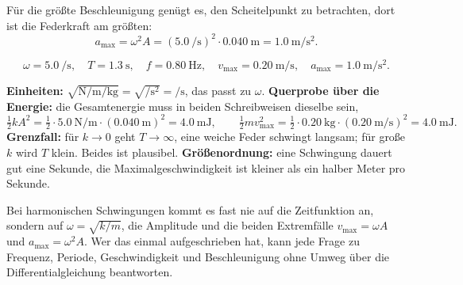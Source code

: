 Für die größte Beschleunigung genügt es, den Scheitelpunkt zu betrachten, dort
ist die Federkraft am größten:
\begin{equation}
  a_{\max} = \omega^2 A
           = \left(\qty{5.0}{\per\second}\right)^2\cdot\qty{0.040}{\metre}
           = \qty{1.0}{\metre\per\second\squared} .
\end{equation}

\begin{ergebnis}
\begin{equation*}
  \omega = \qty{5.0}{\per\second},\quad
  T = \qty{1.3}{\second},\quad
  f = \qty{0.80}{\hertz},\quad
  v_{\max} = \qty{0.20}{\metre\per\second},\quad
  a_{\max} = \qty{1.0}{\metre\per\second\squared}.
\end{equation*}
\end{ergebnis}

\begin{kontrolle}
\textbf{Einheiten:} $\sqrt{\si{\newton\per\metre}/\si{\kilo\gram}}
= \sqrt{\si{\per\second\squared}} = \si{\per\second}$, das passt zu $\omega$.
\textbf{Querprobe über die Energie:} die Gesamtenergie muss in beiden
Schreibweisen dieselbe sein,
\[
  \tfrac{1}{2}kA^2 = \tfrac{1}{2}\cdot\qty{5.0}{\newton\per\metre}\cdot(\qty{0.040}{\metre})^2
  = \qty{4.0}{\milli\joule},
  \qquad
  \tfrac{1}{2}mv_{\max}^2 = \tfrac{1}{2}\cdot\qty{0.20}{\kilo\gram}\cdot(\qty{0.20}{\metre\per\second})^2
  = \qty{4.0}{\milli\joule}.
\]
\textbf{Grenzfall:} für $k\to 0$ geht $T\to\infty$, eine weiche Feder schwingt
langsam; für große $k$ wird $T$ klein. Beides ist plausibel.
\textbf{Größenordnung:} eine Schwingung dauert gut eine Sekunde, die
Maximalgeschwindigkeit ist kleiner als ein halber Meter pro Sekunde.
\end{kontrolle}

\begin{merksatz}
Bei harmonischen Schwingungen kommt es fast nie auf die Zeitfunktion an, sondern
auf $\omega = \sqrt{k/m}$, die Amplitude und die beiden Extremfälle
$v_{\max}=\omega A$ und $a_{\max}=\omega^2 A$. Wer das einmal aufgeschrieben hat,
kann jede Frage zu Frequenz, Periode, Geschwindigkeit und Beschleunigung ohne
Umweg über die Differentialgleichung beantworten.
\end{merksatz}
